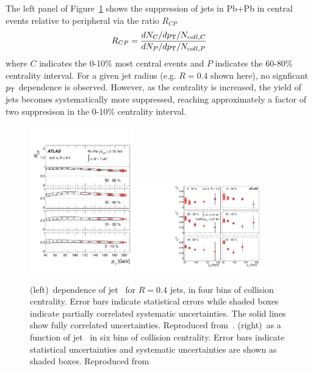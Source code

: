 The left panel of Figure~\ref{fig:pas:rcprfour} shows the suppression of jets in Pb+Pb
in central events relative to peripheral via the ratio $R_{CP}$
\begin{equation}
R_{CP} = \frac{dN_{C}/d\mbox{$p_{\mathrm{T}}$} / N_{coll,C}} {dN_{P}/d\mbox{$p_{\mathrm{T}}$} / N_{coll,P}}
\end{equation}
where $C$ indicates the 0-10\% most central events and $P$ indicates the 60-80\% centrality interval.
For a given jet radius (e.g. $R=0.4$ shown here), no signficant $\mbox{$p_{\mathrm{T}}$}$ dependence is observed.
However, as the centrality is increased, the yield of jets becomes systematically more suppressed,
reaching approximately a factor of two suppresison in the 0-10\% centrality interval.



\begin{figure}[!th]
\begin{center}
\includegraphics[width=0.4\textwidth]{jetfigures/ATLAS_jetRCP_04.pdf}
\includegraphics[width=0.49\textwidth]{jetfigures/ATLAS_jetv2.pdf}
\caption{
(left)\pT\ dependence of jet \Rcp\ for  $R=0.4$ jets,
in four bins of collision centrality. Error bars indicate
statistical errors while shaded boxes indicate
partially correlated systematic uncertainties. 
The solid lines show fully correlated uncertainties. 
Reproduced from~\cite{Aad:2012is}.
(right)\vtjet\ as a function of jet \pT\ in six bins of 
collision centrality.
Error bars indicate statistical uncertainties and 
systematic uncertainties are shown as shaded boxes. Reproduced from~\cite{Aad:2013sla}
}
\label{fig:pas:rcprfour}
\end{center}
\end{figure}


